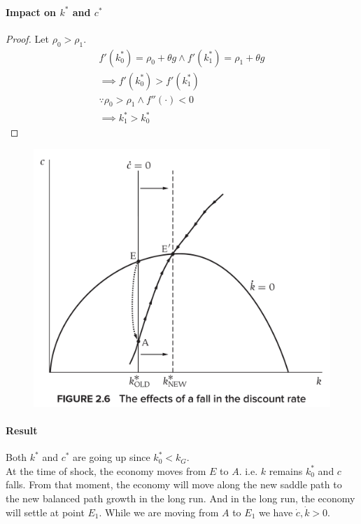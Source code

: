 \documentclass[]{article}
\begin{document}
			\paragraph{Impact on $k^*$ and $c^*$}
			\begin{proof}
				Let $\rho_0 > \rho_1$.
				\begin{gather*}
					f'(k^*_0) = \rho_0 + \theta g \land f'(k^*_1) = \rho_1 + \theta g \\
					\implies f'(k^*_0) > f'(k^*_1) \\
					\because \rho_0 > \rho_1 \land f''(\cdot)<0 \\
					\implies k^*_1 > k^*_0
				\end{gather*}
			\end{proof}
			\begin{figure}[h]
				\centering
				\includegraphics[width=0.6\linewidth]{figures/7_1}
			\end{figure}
			\paragraph{Result}Both $k^*$ and $c^*$ are going up since $k^*_0 < k_G$.\\
			At the time of shock, the economy moves from $E$ to $A$. i.e. $k$ remains $k^*_0$ and $c$ falls. From that moment, the economy will move along the new saddle path to the new balanced path growth in the long run.
			And in the long run, the economy will settle at point $E_1$. While we are moving from $A$ to $E_1$ we have $\dot{c}, \dot{k} > 0$.		
		
\end{document}
